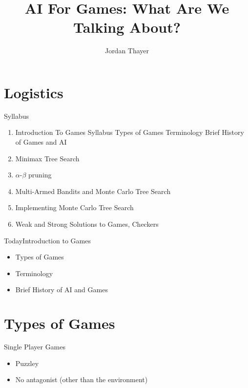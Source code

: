 \documentclass{powerdot}
\title{AI For Games: What Are We Talking About?}
\author{Jordan Thayer}
\date{\vspace{0.2in}}
\begin{document}
\maketitle

\section[slide=false]{Logistics}
\begin{slide}{Syllabus}
  \begin{enumerate}
    \item Introduction To Games
      \subitem Syllabus
      \subitem Types of Games
      \subitem Terminology
      \subitem Brief History of Games and AI
    \item Minimax Tree Search
    \item $\alpha$-$\beta$ pruning
    \item Multi-Armed Bandits and Monte Carlo Tree Search
    \item Implementing Monte Carlo Tree Search
    \item Weak and Strong Solutions to Games, Checkers
  \end{enumerate}
\end{slide}

\begin{slide}{Today\hfill Introduction to Games}
  \begin{itemize}
    \item Types of Games
    \item Terminology
    \item Brief History of AI and Games
  \end{itemize}
\end{slide}
\section{Types of Games}

\begin{slide}{Single Player Games}
            {
              \vspace{1.5in}
              \begin{itemize}
              \item Puzzley
              \item No antagonist (other than the environment)
              \end{itemize}
            }
\end{slide}
\end{document}
